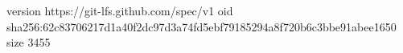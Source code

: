 version https://git-lfs.github.com/spec/v1
oid sha256:62c83706217d1a40f2dc97d3a74fd5ebf79185294a8f720b6c3bbe91abee1650
size 3455

